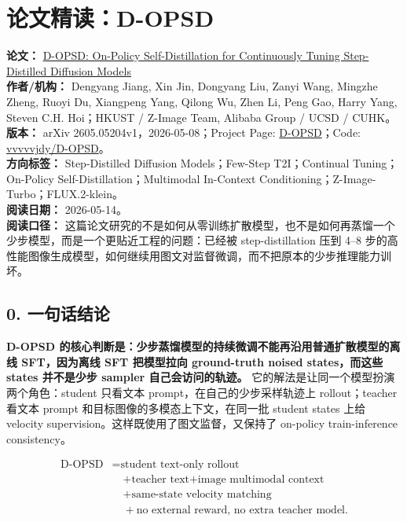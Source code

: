 
\section{论文精读：D-OPSD}

\begin{conceptbox}
\textbf{论文：} \href{https://arxiv.org/abs/2605.05204}{D-OPSD: On-Policy Self-Distillation for Continuously Tuning Step-Distilled Diffusion Models}\\
\textbf{作者/机构：} Dengyang Jiang, Xin Jin, Dongyang Liu, Zanyi Wang, Mingzhe Zheng, Ruoyi Du, Xiangpeng Yang, Qilong Wu, Zhen Li, Peng Gao, Harry Yang, Steven C.H. Hoi；HKUST / Z-Image Team, Alibaba Group / UCSD / CUHK。\\
\textbf{版本：} arXiv 2605.05204v1，2026-05-08；Project Page: \href{https://vvvvvjdy.github.io/d-opsd}{D-OPSD}；Code: \href{https://github.com/vvvvvjdy/D-OPSD}{vvvvvjdy/D-OPSD}。\\
\textbf{方向标签：} Step-Distilled Diffusion Models；Few-Step T2I；Continual Tuning；On-Policy Self-Distillation；Multimodal In-Context Conditioning；Z-Image-Turbo；FLUX.2-klein。\\
\textbf{阅读日期：} 2026-05-14。\\
\textbf{阅读口径：} 这篇论文研究的不是如何从零训练扩散模型，也不是如何再蒸馏一个少步模型，而是一个更贴近工程的问题：已经被 step-distillation 压到 4--8 步的高性能图像生成模型，如何继续用图文对监督微调，而不把原本的少步推理能力训坏。
\end{conceptbox}

\subsection{0. 一句话结论}

\textbf{D-OPSD 的核心判断是：少步蒸馏模型的持续微调不能再沿用普通扩散模型的离线 SFT，因为离线 SFT 把模型拉向 ground-truth noised states，而这些 states 并不是少步 sampler 自己会访问的轨迹。} 它的解法是让同一个模型扮演两个角色：student 只看文本 prompt，在自己的少步采样轨迹上 rollout；teacher 看文本 prompt 和目标图像的多模态上下文，在同一批 student states 上给 velocity supervision。这样既使用了图文监督，又保持了 on-policy train-inference consistency。

\[
\begin{aligned}
\text{D-OPSD}
&= \text{student text-only rollout}\\
&\quad + \text{teacher text+image multimodal context}\\
&\quad + \text{same-state velocity matching}\\
&\quad + \text{no external reward, no extra teacher model}. 
\end{aligned}
\]

